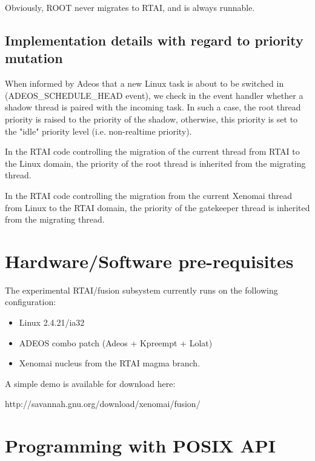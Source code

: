 Obviously, ROOT never migrates to RTAI, and is always runnable.


\subsection{Implementation details with regard to priority mutation}

When informed by Adeos that a new Linux task is about to be switched
in (ADEOS\_SCHEDULE\_HEAD event), we check in the event handler whether
a shadow thread is paired with the incoming task.  In such a case, the
root thread priority is raised to the priority of the shadow,
otherwise, this priority is set to the "idle" priority level
(i.e. non-realtime priority).

In the RTAI code controlling the migration of the current thread
from RTAI to the Linux domain, the priority of the root thread is
inherited from the migrating thread.

In the RTAI code controlling the migration from the current Xenomai
thread from Linux to the RTAI domain, the priority of the gatekeeper
thread is inherited from the migrating thread.

\section{Hardware/Software pre-requisites}

The experimental RTAI/fusion subsystem currently runs on the following
configuration:

\begin{itemize}

\item Linux 2.4.21/ia32
\item ADEOS combo patch (Adeos + Kpreempt + Lolat)
\item Xenomai nucleus from the RTAI magma branch.

\end{itemize}

A simple demo is available for download here:

\centerline{http://savannah.gnu.org/download/xenomai/fusion/}


\section{Programming with POSIX API}
